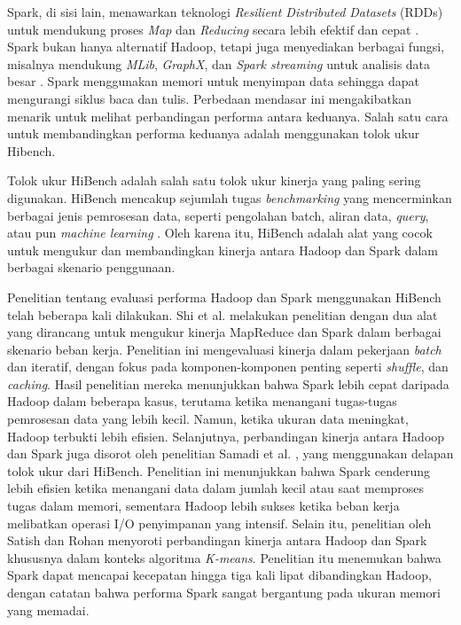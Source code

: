 Spark, di sisi lain, menawarkan teknologi \textit{Resilient Distributed Datasets} (RDDs) untuk mendukung proses \textit{Map} dan \textit{Reducing} secara lebih efektif dan cepat \cite{ahmadvandGapproxUsingGallup2019}. Spark bukan hanya alternatif Hadoop, tetapi juga menyediakan berbagai fungsi, misalnya mendukung \textit{MLib}, \textit{GraphX}, dan \textit{Spark streaming} untuk analisis data besar \cite{zahariaSparkClusterComputing2010}. Spark menggunakan memori untuk menyimpan data sehingga dapat mengurangi siklus baca dan tulis. Perbedaan mendasar ini mengakibatkan menarik untuk melihat perbandingan performa antara keduanya. Salah satu cara untuk membandingkan performa keduanya adalah menggunakan tolok ukur Hibench.

Tolok ukur HiBench adalah salah satu tolok ukur kinerja yang paling sering digunakan. HiBench mencakup sejumlah tugas \textit{benchmarking} yang mencerminkan berbagai jenis pemrosesan data, seperti pengolahan batch, aliran data, \textit{query}, atau pun \textit{machine learning} \cite{huangHiBenchBenchmarkSuitea}. Oleh karena itu, HiBench adalah alat yang cocok untuk mengukur dan membandingkan kinerja antara Hadoop dan Spark dalam berbagai skenario penggunaan.

Penelitian tentang evaluasi performa Hadoop dan Spark menggunakan HiBench telah beberapa kali dilakukan. Shi et al. \cite{shiClashTitansMapReduce2015} melakukan penelitian dengan dua alat yang dirancang untuk mengukur kinerja MapReduce dan Spark dalam berbagai skenario beban kerja. Penelitian ini mengevaluasi kinerja dalam pekerjaan \textit{batch} dan iteratif, dengan fokus pada komponen-komponen penting seperti \textit{shuffle}, dan \textit{caching}. Hasil penelitian mereka menunjukkan bahwa Spark lebih cepat daripada Hadoop dalam beberapa kasus, terutama ketika menangani tugas-tugas pemrosesan data yang lebih kecil. Namun, ketika ukuran data meningkat, Hadoop terbukti lebih efisien. Selanjutnya, perbandingan kinerja antara Hadoop dan Spark juga disorot oleh penelitian Samadi et al. \cite{samadiComparativeStudyHadoop2016}, yang menggunakan delapan tolok ukur dari HiBench. Penelitian ini menunjukkan bahwa Spark cenderung lebih efisien ketika menangani data dalam jumlah kecil atau saat memproses tugas dalam memori, sementara Hadoop lebih sukses ketika beban kerja melibatkan operasi I/O penyimpanan yang intensif. Selain itu, penelitian oleh Satish dan Rohan \cite{gopalaniComparingApacheSpark2015} menyoroti perbandingan kinerja antara Hadoop dan Spark khususnya dalam konteks algoritma \textit{K-means}. Penelitian itu menemukan bahwa Spark dapat mencapai kecepatan hingga tiga kali lipat dibandingkan Hadoop, dengan catatan bahwa performa Spark sangat bergantung pada ukuran memori yang memadai.

